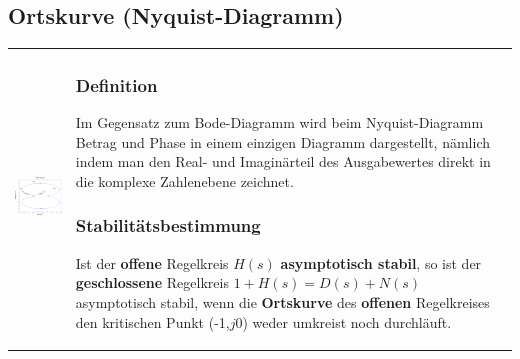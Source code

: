 \subsection{Ortskurve (Nyquist-Diagramm)  }
\begin{tabular}{ll}
	\parbox{7cm}{
		\includegraphics[width=7cm]{./bilder/nyquist.png}
	}
	& \parbox{11cm}{
		\subsubsection{Definition}
		Im Gegensatz zum Bode-Diagramm wird beim Nyquist-Diagramm Betrag und Phase in
		einem einzigen Diagramm dargestellt, nämlich indem man den Real- und
		Imaginärteil des Ausgabewertes direkt in die komplexe Zahlenebene zeichnet.
		
		\subsubsection{Stabilitätsbestimmung}
		Ist der {\bf offene} Regelkreis $H(s)$ {\bf asymptotisch
		stabil}, so ist der {\bf geschlossene}
		Regelkreis $1+H(s)=D(s)+N(s)$ asymptotisch stabil, wenn die {\bf
		Ortskurve} des {\bf offenen} Regelkreises den kritischen Punkt
		(-1,$j0$) weder umkreist noch durchl\"auft.
	}
\end{tabular}


